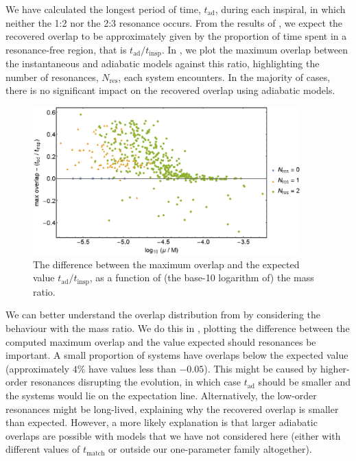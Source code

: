 We have calculated the longest period of time, $t_\mathrm{ad}$, during each inspiral, in which neither the 1:2 nor the 2:3 resonance occurs. From the results of , we expect the recovered overlap to be approximately given by the proportion of time spent in a resonance-free region, that is $t_\mathrm{ad} / t_\mathrm{insp}$. In , we plot the maximum overlap between the instantaneous and adiabatic models against this ratio, highlighting the number of resonances, $N_\mathrm{res}$, each system encounters. In the majority of cases, there is no significant impact on the recovered overlap using adiabatic models.

\begin{figure}[htbp]
\centering
\includegraphics[width=0.92\textwidth]{pop_adSNR_vs_eta}
\caption{\label{fig:pop-adSNR-vs-eta}The difference between the maximum overlap and the expected value $t_\mathrm{ad} / t_\mathrm{insp}$, as a function of (the base-10 logarithm of) the mass ratio.}
\end{figure}

We can better understand the overlap distribution from  by considering the behaviour with the mass ratio. We do this in , plotting the difference between the computed maximum overlap and the value expected should resonances be important. A small proportion of systems have overlaps below the expected value (approximately $4\%$ have values less than $-0.05$). This might be caused by higher-order resonances disrupting the evolution, in which case $t_\mathrm{ad}$ should be smaller and the systems would lie on the expectation line. Alternatively, the low-order resonances might be long-lived, explaining why the recovered overlap is smaller than expected. However, a more likely explanation is that larger adiabatic overlaps are possible with models that we have not considered here (either with different values of $t_\mathrm{match}$ or outside our one-parameter family altogether).%

